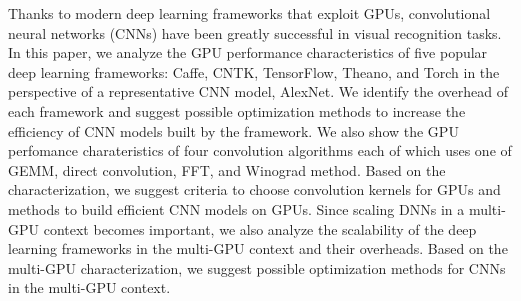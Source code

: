 Thanks to modern deep learning frameworks that exploit GPUs, convolutional neural networks (CNNs) have been greatly successful in visual recognition tasks. In this paper, we analyze the GPU performance characteristics of five popular deep learning frameworks: Caffe, CNTK, TensorFlow, Theano, and Torch in the perspective of a representative CNN model, AlexNet. We identify the overhead of each framework and suggest possible optimization methods to increase the efficiency of CNN models built by the framework. We also show the GPU perfomance charateristics of four convolution algorithms each of which uses one of GEMM, direct convolution, FFT, and Winograd method. Based on the characterization, we suggest criteria to choose convolution kernels for GPUs and methods to build efficient CNN models on GPUs. Since scaling DNNs in a multi-GPU context becomes important, we also analyze the scalability of the deep learning frameworks in the multi-GPU context and their overheads. Based on the multi-GPU characterization, we suggest possible optimization methods for CNNs in the multi-GPU context.